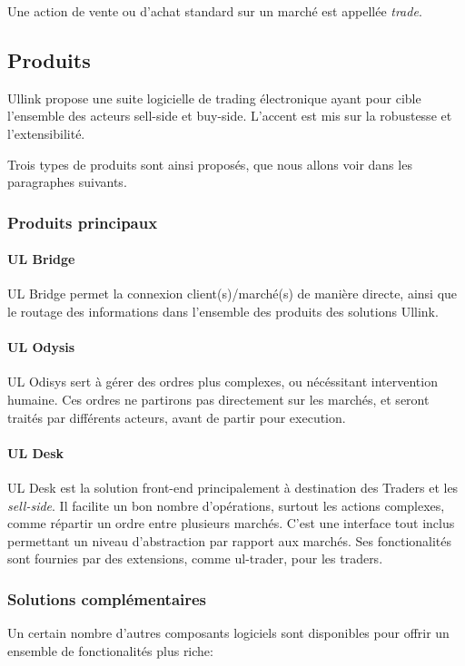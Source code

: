 \documentclass[a4paper, 12pt]{article}
\begin{document}
Une action de vente ou d'achat standard sur un marché est appellée \emph{trade}.

\subsection{Produits}

Ullink propose une suite logicielle de trading électronique ayant pour cible l'ensemble des acteurs sell-side et buy-side. L'accent est mis sur la robustesse et l'extensibilité.

Trois types de produits sont ainsi proposés, que nous allons voir dans les paragraphes suivants.

\subsubsection{Produits principaux}

\paragraph{UL Bridge}

UL Bridge permet la connexion client(s)/marché(s) de manière directe, ainsi que le routage des informations dans l'ensemble des produits des solutions Ullink.

\paragraph{UL Odysis}

UL Odisys sert à gérer des ordres plus complexes, ou nécéssitant intervention humaine. Ces ordres ne partirons pas directement sur les marchés, et seront traités par différents acteurs, avant de partir pour execution.

\paragraph{UL Desk}
UL Desk est la solution front-end principalement à destination des Traders et les \emph{sell-side}. Il facilite un bon nombre d'opérations, surtout les actions complexes, comme répartir un ordre entre plusieurs marchés. C'est une interface tout inclus permettant un niveau d'abstraction par rapport aux marchés. Ses fonctionalités sont fournies par des extensions, comme ul-trader, pour les traders.

\subsubsection{Solutions complémentaires}
Un certain nombre d'autres composants logiciels sont disponibles pour offrir un ensemble de fonctionalités plus riche:
\end{document}
